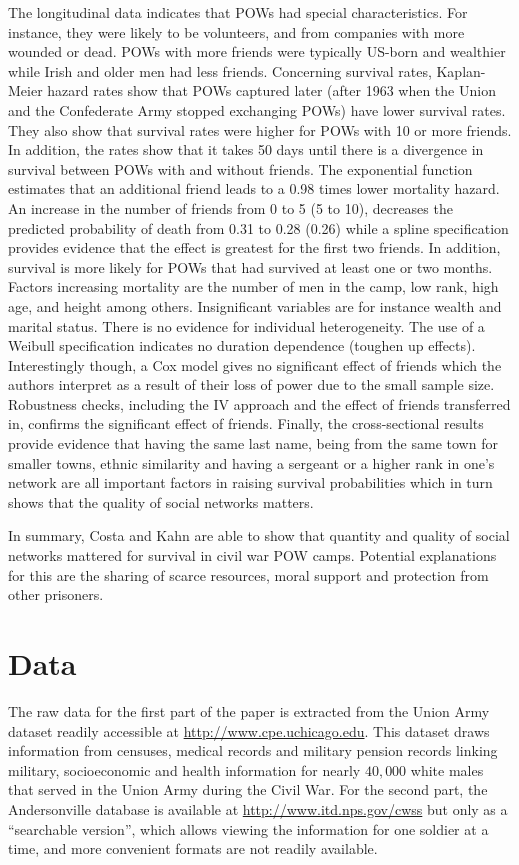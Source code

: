 \documentclass[draft.tex]{subfiles}
\begin{document}
The longitudinal data indicates that POWs had special characteristics. For instance, they were likely to be volunteers, and from companies with more wounded or dead. POWs with more friends were typically US-born and wealthier while Irish and older men had less friends. Concerning survival rates, Kaplan-Meier hazard rates show that POWs captured later (after 1963 when the Union and the Confederate Army stopped exchanging POWs) have lower survival rates. They also show that survival rates were higher for POWs with 10 or more friends. In addition, the rates show that it takes 50 days until there is a divergence in survival between POWs with and without friends. The exponential function estimates that an additional friend leads to a 0.98 times lower mortality hazard. An increase in the number of friends from 0 to 5 (5 to 10), decreases the predicted probability of death from 0.31 to 0.28 (0.26) while a spline specification provides evidence that the effect is greatest for the first two friends. In addition, survival is more likely for POWs that had survived at least one or two months. Factors increasing mortality are the number of men in the camp, low rank, high age, and height among others. Insignificant variables are for instance wealth and marital status. There is no evidence for individual heterogeneity. The use of a Weibull specification indicates no duration dependence (toughen up effects). Interestingly though, a Cox model gives no significant effect of friends which the authors interpret as a result of their loss of power due to the small sample size. Robustness checks, including the IV approach and the effect of friends transferred in, confirms the significant effect of friends. Finally, the cross-sectional results provide evidence that having the same last name, being from the same town for smaller towns, ethnic similarity and having a sergeant or a higher rank in one's network are all important factors in raising survival probabilities which in turn shows that the quality of social networks matters.

In summary, Costa and Kahn are able to show that quantity and quality of social networks mattered for survival in civil war POW camps. Potential explanations for this are the sharing of scarce resources, moral support and protection from other prisoners.

\section{Data}
The raw data for the first part of the paper is extracted from the Union Army dataset readily accessible at \url{http://www.cpe.uchicago.edu}. This dataset draws information from censuses, medical records and military pension records linking military, socioeconomic and health information for nearly $40,000$ white males that served in the Union Army during the Civil War. For the second part, the Andersonville database is available at \url{http://www.itd.nps.gov/cwss} but only as a ``searchable version'', which allows viewing the information for one soldier at a time, and more convenient formats are not readily available.
\end{document}
